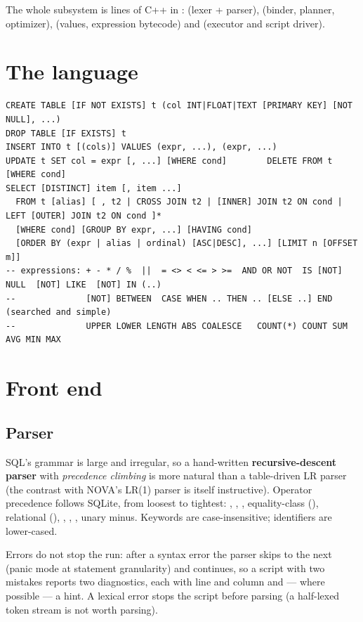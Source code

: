 The whole subsystem is \SQLLOC{} lines of C++ in :  (lexer + parser),  (binder, planner, optimizer),  (values, expression bytecode) and  (executor and script driver).

\section{The language}
\begin{lstlisting}[language=sqlx,style=tiny,caption={Supported statements (summary).},label={lst:sqlgrammar}]
CREATE TABLE [IF NOT EXISTS] t (col INT|FLOAT|TEXT [PRIMARY KEY] [NOT NULL], ...)
DROP TABLE [IF EXISTS] t
INSERT INTO t [(cols)] VALUES (expr, ...), (expr, ...)
UPDATE t SET col = expr [, ...] [WHERE cond]        DELETE FROM t [WHERE cond]
SELECT [DISTINCT] item [, item ...]
  FROM t [alias] [ , t2 | CROSS JOIN t2 | [INNER] JOIN t2 ON cond | LEFT [OUTER] JOIN t2 ON cond ]*
  [WHERE cond] [GROUP BY expr, ...] [HAVING cond]
  [ORDER BY (expr | alias | ordinal) [ASC|DESC], ...] [LIMIT n [OFFSET m]]
-- expressions: + - * / %  ||  = <> < <= > >=  AND OR NOT  IS [NOT] NULL  [NOT] LIKE  [NOT] IN (..)
--              [NOT] BETWEEN  CASE WHEN .. THEN .. [ELSE ..] END  (searched and simple)
--              UPPER LOWER LENGTH ABS COALESCE   COUNT(*) COUNT SUM AVG MIN MAX
\end{lstlisting}

\section{Front end}
\subsection{Parser}
SQL's grammar is large and irregular, so a hand-written \textbf{recursive-descent parser} with \emph{precedence climbing} is more natural than a table-driven LR parser (the contrast with NOVA's LR(1) parser is itself instructive). Operator precedence follows SQLite, from loosest to tightest: , , , equality-class (), relational (\code{< <= > >=}), \code{+ -}, \code{* / \%}, \code{||}, unary minus. Keywords are case-insensitive; identifiers are lower-cased.

Errors do not stop the run: after a syntax error the parser skips to the next \code{;} (panic mode at statement granularity) and continues, so a script with two mistakes reports two diagnostics, each with line and column and --- where possible --- a hint. A lexical error stops the script before parsing (a half-lexed token stream is not worth parsing).

